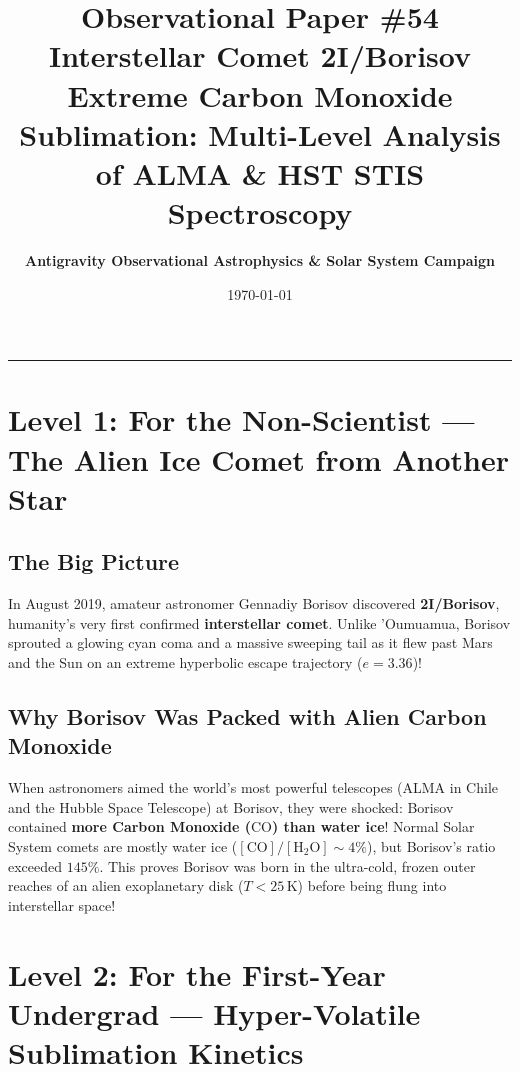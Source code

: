 \documentclass[11pt,a4paper]{article}
\title{\Huge \textbf{Observational Paper \#54}\\ \Large Interstellar Comet 2I/Borisov Extreme Carbon Monoxide Sublimation: Multi-Level Analysis of ALMA \& HST STIS Spectroscopy}
\author{\textbf{Antigravity Observational Astrophysics \& Solar System Campaign}}
\date{\today}
\begin{document}
\maketitle

\vspace{-1em}
\begin{center}
\rule{\textwidth}{1.5pt}
\end{center}

\section*{Level 1: For the Non-Scientist — The Alien Ice Comet from Another Star}

\subsection*{The Big Picture}
In August 2019, amateur astronomer Gennadiy Borisov discovered \textbf{2I/Borisov}, humanity's very first confirmed \textbf{interstellar comet}. Unlike 'Oumuamua, Borisov sprouted a glowing cyan coma and a massive sweeping tail as it flew past Mars and the Sun on an extreme hyperbolic escape trajectory ($e = 3.36$)!

\subsection*{Why Borisov Was Packed with Alien Carbon Monoxide}
When astronomers aimed the world's most powerful telescopes (ALMA in Chile and the Hubble Space Telescope) at Borisov, they were shocked: Borisov contained \textbf{more Carbon Monoxide ($\mathrm{CO}$) than water ice}! Normal Solar System comets are mostly water ice ($[\mathrm{CO}]/[\mathrm{H_2O}] \sim 4\%$), but Borisov's ratio exceeded \textbf{$145\%$}. This proves Borisov was born in the ultra-cold, frozen outer reaches of an alien exoplanetary disk ($T < 25\,\text{K}$) before being flung into interstellar space!

\newpage

\section*{Level 2: For the First-Year Undergrad — Hyper-Volatile Sublimation Kinetics}
\end{document}
